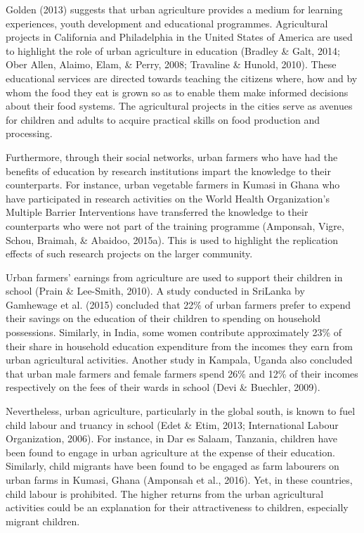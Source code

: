 Golden (2013) suggests that urban agriculture provides a medium for learning experiences, youth development and educational programmes. Agricultural projects in California and Philadelphia in the United States of America are used to highlight the role of urban agriculture in education (Bradley \& Galt, 2014; Ober Allen, Alaimo, Elam, \& Perry, 2008; Travaline \& Hunold, 2010). These educational services are directed towards teaching the citizens where, how and by whom the food they eat is grown so as to enable them make informed decisions about their food systems. The agricultural projects in the cities serve as avenues for children and adults to acquire practical skills on food production and processing.

Furthermore, through their social networks, urban farmers who have had the benefits of education by research institutions impart the knowledge to their counterparts. For instance, urban vegetable farmers in Kumasi in Ghana who have participated in research activities on the World Health Organization's Multiple Barrier Interventions have transferred the knowledge to their counterparts who were not part of the training programme (Amponsah, Vigre, Schou, Braimah, \& Abaidoo, 2015a). This is used to highlight the replication effects of such research projects on the larger community.

Urban farmers' earnings from agriculture are used to support their children in school (Prain \& Lee-Smith, 2010). A study conducted in SriLanka by Gamhewage et al. (2015) concluded that 22\% of urban farmers prefer to expend their savings on the education of their children to spending on household possessions. Similarly, in India, some women contribute approximately 23\% of their share in household education expenditure from the incomes they earn from urban agricultural activities. Another study in Kampala, Uganda also concluded that urban male farmers and female farmers spend 26\% and 12\% of their incomes respectively on the fees of their wards in school (Devi \& Buechler, 2009).

Nevertheless, urban agriculture, particularly in the global south, is known to fuel child labour and truancy in school (Edet \& Etim, 2013; International Labour Organization, 2006). For instance, in Dar es Salaam, Tanzania, children have been found to engage in urban agriculture at the expense of their education. Similarly, child migrants have been found to be engaged as farm labourers on urban farms in Kumasi, Ghana (Amponsah et al., 2016). Yet, in these countries, child labour is prohibited. The higher returns from the urban agricultural activities could be an explanation for their attractiveness to children, especially migrant children.

